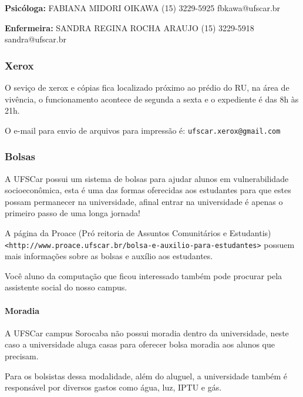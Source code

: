 \begin{multicols}{2}
\noindent \textbf{Psicóloga:}
  \newline FABIANA MIDORI OIKAWA
  \newline (15) 3229-5925
  \newline fbkawa@ufscar.br

\noindent \textbf{Enfermeira:}
  \newline SANDRA REGINA ROCHA ARAUJO
  \newline (15) 3229-5918
  \newline sandra@ufscar.br

\end{multicols}

\subsubsection{Xerox}
O seviço de xerox e cópias fica localizado próximo ao prédio do RU, na área de vivência, o funcionamento acontece de segunda a sexta e o expediente é das 8h às 21h. 

O e-mail para envio de arquivos para impressão é: \texttt{ufscar.xerox@gmail.com}

\subsubsection{Bolsas}
A UFSCar possui um sistema de bolsas para ajudar alunos em vulnerabilidade socioeconômica, esta é uma das formas oferecidas aos estudantes para que estes possam permanecer na universidade, afinal entrar na universidade é apenas o primeiro passo de uma longa jornada!

A página da Proace (Pró reitoria de Assuntos Comunitários e Estudantis) \texttt{<http://www.proace.ufscar.br/bolsa-e-auxilio-para-estudantes>} possuem mais informações sobre as bolsas e auxílio aos estudantes.

Você aluno da computação que ficou interessado também pode procurar pela assistente social do nosso campus.

\paragraph{Moradia}\label{moradia}
A UFSCar campus Sorocaba não possui moradia dentro da universidade, neste caso a universidade aluga casas para oferecer bolsa moradia aos alunos que precisam.

Para os bolsistas dessa modalidade, além do aluguel, a universidade também é responsável por diversos gastos como água, luz, IPTU e gás. 

